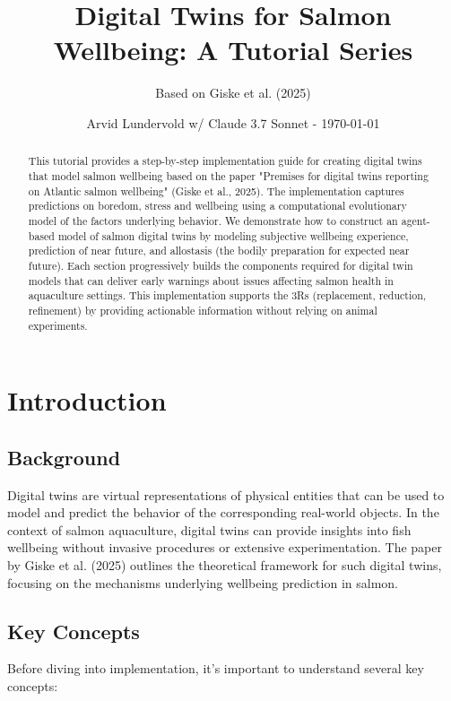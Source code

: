 \documentclass[11pt,a4paper]{article}
\title{Digital Twins for Salmon Wellbeing: A Tutorial Series}
\author{Based on Giske et al. (2025)}
\date{Arvid Lundervold w/ Claude 3.7 Sonnet - \today}
\begin{document}
\maketitle

\begin{abstract}
This tutorial provides a step-by-step implementation guide for creating digital twins that model salmon wellbeing based on the paper "Premises for digital twins reporting on Atlantic salmon wellbeing" (Giske et al., 2025). The implementation captures predictions on boredom, stress and wellbeing using a computational evolutionary model of the factors underlying behavior. We demonstrate how to construct an agent-based model of salmon digital twins by modeling subjective wellbeing experience, prediction of near future, and allostasis (the bodily preparation for expected near future). Each section progressively builds the components required for digital twin models that can deliver early warnings about issues affecting salmon health in aquaculture settings. This implementation supports the 3Rs (replacement, reduction, refinement) by providing actionable information without relying on animal experiments.
\end{abstract}

\tableofcontents
\newpage

\section{Introduction}
\subsection{Background}
Digital twins are virtual representations of physical entities that can be used to model and predict the behavior of the corresponding real-world objects. In the context of salmon aquaculture, digital twins can provide insights into fish wellbeing without invasive procedures or extensive experimentation. The paper by Giske et al. (2025) \cite{giske2025premises} outlines the theoretical framework for such digital twins, focusing on the mechanisms underlying wellbeing prediction in salmon.


\subsection{Key Concepts}
Before diving into implementation, it's important to understand several key concepts:
\end{document}
